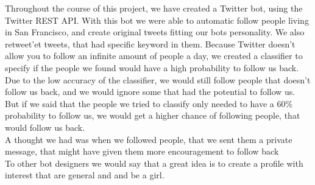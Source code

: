 Throughout the course of this project, we have created a Twitter bot, using the Twitter REST API. With this bot we were able to automatic follow people living in San Francisco, and create original tweets fitting our bots personality. We also retweet'et tweets, that had specific keyword in them. Because Twitter doesn't allow you to follow an infinite amount of people a day, we created a classifier to specify if the people we found would have a high probability to follow us back. Due to the low accuracy of the classifier, we would still follow people that doesn't follow us back, and we would ignore some that had the potential to follow us. But if we said that the people we tried to classify only needed to have a 60\% probability to follow us, we would get a higher chance of following people, that would follow us back.\\
A thought we had was when we followed people, that we sent them a private message, that might have given them more encouragement to follow back\\
To other bot designers we would say that a great idea is to create a profile with interest that are general and and be a girl. 